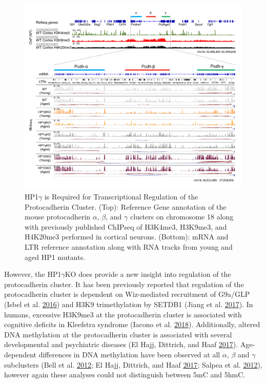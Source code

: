 \documentclass[onehalf,12pt]{beavtex}
\begin{document}
  \begin{figure}
  
  {\centering \includegraphics[width=1\linewidth, ]{./figure/discussion/Pcdh_clust3} 
  
  }
  
  \caption[HP1$\gamma$ is Required for Transcriptional Regulation of the Protocadherin Cluster]{HP1$\gamma$ is Required for Transcriptional Regulation of the Protocadherin Cluster. (Top): Reference Gene annotation of the mouse protocadherin $\alpha$, $\beta$, and $\gamma$ clusters on chromosome 18 along with previously published ChIPseq of H3K4me3, H3K9me3, and H4K20me3 performed in cortical neurons. (Bottom): mRNA and LTR reference annotation along with RNA tracks from young and aged HP1 mutants.}\label{fig:cadclust}
  \end{figure}
  
  However, the HP1\(\gamma\)KO does provide a new insight into regulation
  of the protocadherin cluster. It has been previously reported that
  regulation of the protocadherin cluster is dependent on Wiz-mediated
  recruitment of G9a/GLP (Isbel et al.
  \protect\hyperlink{ref-IsbelWizbindsactive2016}{2016}) and H3K9
  trimethylation by SETDB1 (Jiang et al.
  \protect\hyperlink{ref-JiangmethyltransferaseSETDB1regulates2017}{2017}).
  In humans, excessive H3K9me3 at the protocadherin cluster is associated
  with cognitive deficits in Kleefstra syndrome (Iacono et al.
  \protect\hyperlink{ref-IaconoIncreasedH3K9methylation2018}{2018}).
  Additionally, altered DNA methylation at the protocadherin cluster is
  associated with several developmental and psychiatric diseases (El Hajj,
  Dittrich, and Haaf
  \protect\hyperlink{ref-ElHajjEpigeneticdysregulationprotocadherins2017d}{2017}).
  Age-dependent differences in DNA methylation have been observed at all
  \(\alpha\), \(\beta\) and \(\gamma\) subclusters (Bell et al.
  \protect\hyperlink{ref-BellEpigenomeWideScansIdentify2012a}{2012}; El
  Hajj, Dittrich, and Haaf
  \protect\hyperlink{ref-ElHajjEpigeneticdysregulationprotocadherins2017d}{2017};
  Salpea et al.
  \protect\hyperlink{ref-SalpeaPostnataldevelopmentagerelated2012}{2012}),
  however again these analyses could not distinguish between 5mC and 5hmC.
  
\end{document}
